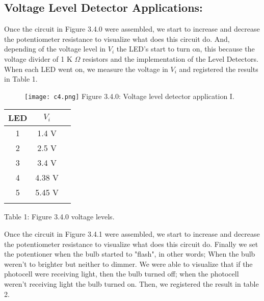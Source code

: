 \subsection{Voltage Level Detector Applications:}

Once the circuit in Figure 3.4.0 were assembled, we start to increase and decrease the potentiometer resistance to visualize what does this circuit do. And, depending of the voltage level in $V_{i}$ the LED's start to turn on, this because the voltage divider of 1 K $\Omega$ resistors and the implementation of the Level Detectors. When each LED went on, we measure the voltage in $V_{i}$ and registered the results in Table 1.


\begin{figure}[H]
\texttt{[image: c4.png]}
\centering \linebreak \linebreak Figure 3.4.0: Voltage level detector application I.
\end{figure} \hfill

\begin{center}
\begin{tabular}[.5cm]{c c c}
\toprule
\toprule
\hspace{100pt} LED \hspace{100pt} & \hspace{100pt} $V_{i}$ \hspace{100pt}  \\
\midrule
\midrule
1 & 1.4 V \\
\cmidrule{1-2}
2 & 2.5 V \\
\cmidrule{1-2}
3 & 3.4 V \\
\cmidrule{1-2}
4 & 4.38 V \\
\cmidrule{1-2}
5 & 5.45 V \\
\bottomrule
\linebreak
\end{tabular}
\linebreak Table 1: Figure 3.4.0 voltage levels.
\end{center} \hfill

\pagebreak

Once the circuit in Figure 3.4.1 were assembled, we start to increase and decrease the potentiometer resistance to visualize what does this circuit do. Finally we set the potentioner when the bulb started to "flash", in other words; When the bulb weren't to brighter but neither to dimmer. We were able to visualize that if the photocell were receiving light, then the bulb turned off; when the photocell weren't receiving light the bulb turned on. Then, we registered the result in table 2.

